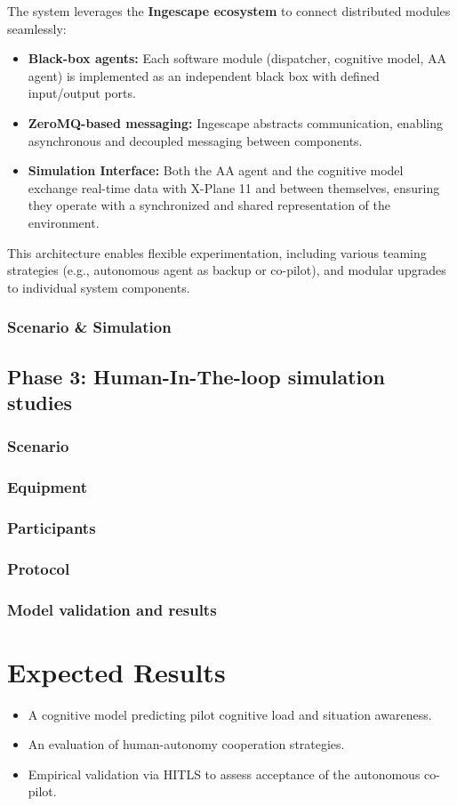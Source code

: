 \documentclass[12pt,a4paper]{article} %
\begin{document}
	The system leverages the \textbf{Ingescape ecosystem} to connect distributed modules seamlessly: \begin{itemize} \item \textbf{Black-box agents:} Each software module (dispatcher, cognitive model, AA agent) is implemented as an independent black box with defined input/output ports. \item \textbf{ZeroMQ-based messaging:} Ingescape abstracts communication, enabling asynchronous and decoupled messaging between components. \item \textbf{Simulation Interface:} Both the AA agent and the cognitive model exchange real-time data with X-Plane 11 and between themselves, ensuring they operate with a synchronized and shared representation of the environment. \end{itemize}

	This architecture enables flexible experimentation, including various teaming strategies (e.g., autonomous agent as backup or co-pilot), and modular upgrades to individual system components.

	\subsubsection{Scenario \& Simulation}
	\subsection{Phase 3: Human-In-The-loop simulation studies}
	\subsubsection{Scenario}
	\subsubsection{Equipment}
	\subsubsection{Participants}
	\subsubsection{Protocol}
	\subsubsection{Model validation and results}
	
	\section{Expected Results} %
	\begin{itemize}
		\item A cognitive model predicting pilot cognitive load and situation awareness.
		\item An evaluation of human-autonomy cooperation strategies.
		\item Empirical validation via HITLS to assess acceptance of the autonomous co-pilot.
	\end{itemize} %
	
\end{document}
